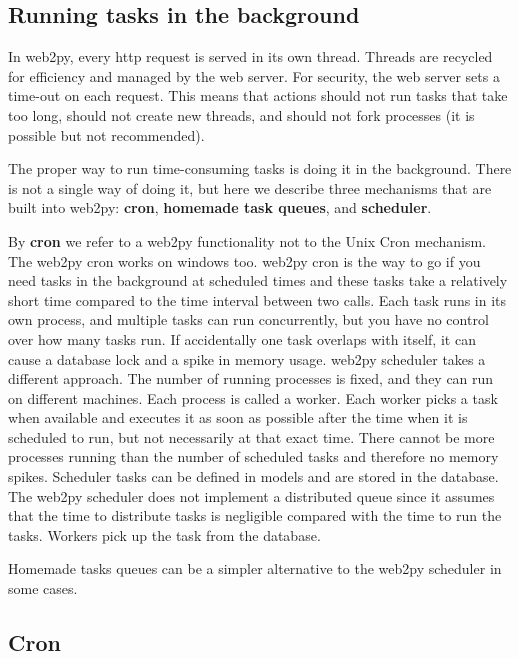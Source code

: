 \documentclass[justified,sixbynine,notoc]{tufte-book}
\def\inxx#1{\index{#1}}
\begin{document}
\begin{fullwidth}
\goodbreak\section{Running tasks in the background}

In web2py, every http request is served in its own thread. Threads are recycled for efficiency and managed by the web server. For security, the web server sets a time-out on each request. This means that actions should not run tasks that take too long, should not create new threads, and should not fork processes (it is possible but not recommended).

The proper way to run time-consuming tasks is doing it in the background. There is not a single way of doing it, but here we describe three mechanisms that are built into web2py: {\bf cron}, {\bf homemade task queues}, and {\bf scheduler}.

By {\bf cron} we refer to a web2py functionality not to the Unix Cron mechanism. The web2py cron works on windows too.
\noindent web2py cron is the way to go if you need tasks in the background at scheduled times and these tasks take a relatively short time compared to the time interval between two calls. Each task runs in its own process, and multiple tasks can run concurrently, but you have no control over how many tasks run. If accidentally one task overlaps with itself, it can cause a database lock and a spike in memory usage.
\noindent web2py scheduler takes a different approach. The number of running processes is fixed, and they can run on different machines. Each process is called a worker. Each worker picks a task when available and executes it as soon as possible after the time when it is scheduled to run, but not necessarily at that exact time. There cannot be more processes running than the number of scheduled tasks and therefore no memory spikes. Scheduler tasks can be defined in models and are stored in the database. The web2py scheduler does not implement a distributed queue since it assumes that the time to distribute tasks is negligible compared with the time to run the tasks. Workers pick up the task from the database.

Homemade tasks queues can be a simpler alternative to the web2py scheduler in some cases.

\goodbreak\subsection{Cron}

\inxx{cron}


\end{fullwidth}
\end{document}
